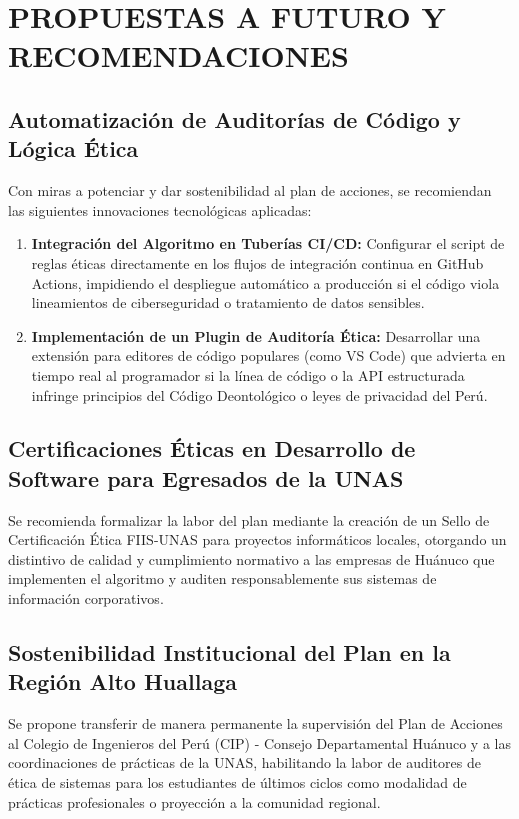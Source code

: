 \documentclass[12pt,a4paper]{article}
\begin{document}
\newpage

\section{PROPUESTAS A FUTURO Y RECOMENDACIONES}
\thispagestyle{empty}

\subsection{Automatización de Auditorías de Código y Lógica Ética}
Con miras a potenciar y dar sostenibilidad al plan de acciones, se recomiendan las siguientes innovaciones tecnológicas aplicadas:
\begin{enumerate}
    \item \textbf{Integración del Algoritmo en Tuberías CI/CD:} Configurar el script de reglas éticas directamente en los flujos de integración continua en GitHub Actions, impidiendo el despliegue automático a producción si el código viola lineamientos de ciberseguridad o tratamiento de datos sensibles.
    \item \textbf{Implementación de un Plugin de Auditoría Ética:} Desarrollar una extensión para editores de código populares (como VS Code) que advierta en tiempo real al programador si la línea de código o la API estructurada infringe principios del Código Deontológico o leyes de privacidad del Perú.
\end{enumerate}

\subsection{Certificaciones Éticas en Desarrollo de Software para Egresados de la UNAS}
Se recomienda formalizar la labor del plan mediante la creación de un Sello de Certificación Ética FIIS-UNAS para proyectos informáticos locales, otorgando un distintivo de calidad y cumplimiento normativo a las empresas de Huánuco que implementen el algoritmo y auditen responsablemente sus sistemas de información corporativos.

\subsection{Sostenibilidad Institucional del Plan en la Región Alto Huallaga}
Se propone transferir de manera permanente la supervisión del Plan de Acciones al Colegio de Ingenieros del Perú (CIP) - Consejo Departamental Huánuco y a las coordinaciones de prácticas de la UNAS, habilitando la labor de auditores de ética de sistemas para los estudiantes de últimos ciclos como modalidad de prácticas profesionales o proyección a la comunidad regional.
\end{document}
